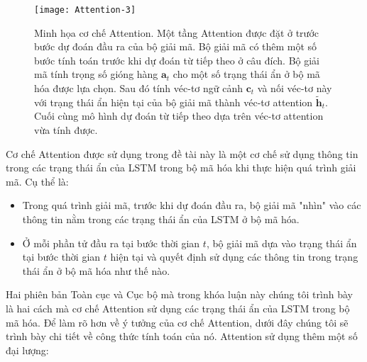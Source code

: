 \begin{figure}
	\centering
	\texttt{[image: Attention-3]}
	\caption[Minh họa cơ chế Attention.]{Minh họa cơ chế Attention. Một tầng Attention được đặt ở trước bước dự đoán đầu ra của bộ giải mã. Bộ giải mã có thêm một số bước tính toán trước khi dự đoán từ tiếp theo ở câu đích. Bộ giải mã tính trọng số gióng hàng $\bm{a}_t$ cho một số trạng thái ẩn ở bộ mã hóa được lựa chọn. Sau đó tính véc-tơ ngữ cảnh $\bm{c}_t$ và nối véc-tơ này với trạng thái ẩn hiện tại của bộ giải mã thành véc-tơ attention $\bm{\tilde{h}}_t$. Cuối cùng mô hình dự đoán từ tiếp theo dựa trên véc-tơ attention vừa tính được.}
	\label{fig_Attention}
\end{figure}
Cơ chế Attention được sử dụng trong đề tài này là một cơ chế sử dụng thông tin trong các trạng thái ẩn của LSTM trong bộ mã hóa khi thực hiện quá trình giải mã. Cụ thể là:
\begin{itemize}
	\item Trong quá trình giải mã, trước khi dự đoán đầu ra, bộ giải mã "nhìn" vào các thông tin nằm trong các trạng thái ẩn của LSTM ở bộ mã hóa.
	\item Ở mỗi phần tử đầu ra tại bước thời gian $t$, bộ giải mã dựa vào trạng thái ẩn tại bước thời gian $t$ hiện tại và quyết định sử dụng các thông tin trong trạng thái ẩn ở bộ mã hóa như thế nào.
\end{itemize}
Hai phiên bản Toàn cục và Cục bộ mà trong khóa luận này chúng tôi trình bày là hai cách mà cơ chế Attention sử dụng các trạng thái ẩn của LSTM trong bộ mã hóa.
Để làm rõ hơn về ý tưởng của cơ chế Attention, dưới đây chúng tôi sẽ trình bày chi tiết về công thức tính toán của nó.
Attention sử dụng thêm một số đại lượng:
